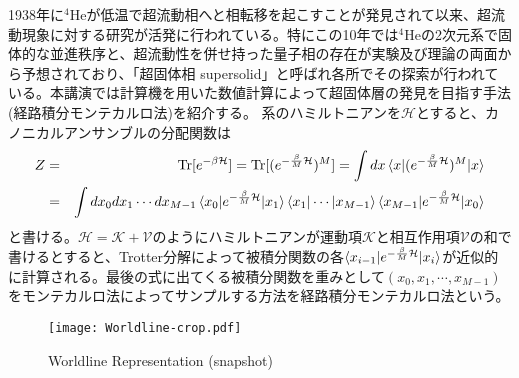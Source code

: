\documentclass[a4j,12pt]{jarticle}
\begin{document}
1938年に${}^4$Heが低温で超流動相へと相転移を起こすことが発見されて以来、超流動現象に対する研究が活発に行われている。特にこの10年では${}^4$Heの2次元系で固体的な並進秩序と、超流動性を併せ持った量子相の存在が実験及び理論の両面から予想されており、「超固体相 supersolid」と呼ばれ各所でその探索が行われている。本講演では計算機を用いた数値計算によって超固体層の発見を目指す手法(経路積分モンテカルロ法)を紹介する。
系のハミルトニアンを$\mathcal{H}$とすると、カノニカルアンサンブルの分配関数は
\begin{eqnarray}
  Z &=& \mathrm{Tr}[e^{-\beta\mathcal{H}}] = \mathrm{Tr}[(e^{-\frac{\beta}{M}\mathcal{H}})^M] = \int dx\braket{x|(e^{-\frac{\beta}{M}\mathcal{H}})^M|x} \\
  &=&\int dx_0dx_1\cdots dx_{M-1} \braket{x_0|e^{-\frac{\beta}{M}\mathcal{H}}|x_1}\bra{x_1}\cdots\ket{x_{M-1}}\braket{x_{M-1}|e^{-\frac{\beta}{M}\mathcal{H}}|x_0}
\end{eqnarray}
と書ける。$\mathcal{H} = \mathcal{K}+\mathcal{V}$のようにハミルトニアンが運動項$\mathcal{K}$と相互作用項$\mathcal{V}$の和で書けるとすると、Trotter分解によって被積分関数の各$\braket{x_{i-1}|e^{-\frac{\beta}{M}\mathcal{H}}|x_i}$が近似的に計算される。最後の式に出てくる被積分関数を重みとして$(x_0,x_1,\cdots,x_{M-1})$をモンテカルロ法によってサンプルする方法を経路積分モンテカルロ法という。

\begin{figure}[bh]
\begin{center}
\texttt{[image: Worldline-crop.pdf]}
\end{center}
\caption{Worldline Representation (snapshot)}
\end{figure}

%
\end{document}
